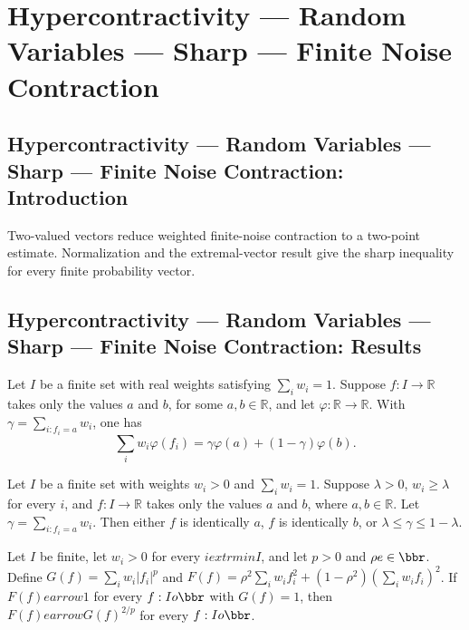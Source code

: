 \section{Hypercontractivity --- Random Variables --- Sharp --- Finite Noise Contraction}
\subsection*{Hypercontractivity --- Random Variables --- Sharp --- Finite Noise Contraction: Introduction}
Two-valued vectors reduce weighted finite-noise contraction to a two-point estimate. Normalization and the extremal-vector result give the sharp inequality for every finite probability vector.

\subsection*{Hypercontractivity --- Random Variables --- Sharp --- Finite Noise Contraction: Results}

\begin{theorem}
\leanok
{}
Let $I$ be a finite set with real weights satisfying $\sum_iw_i=1$. Suppose
$f:I\to\mathbb{R}$ takes only the values $a$ and $b$, for some $a,b\in\mathbb{R}$, and
let $\varphi:\mathbb{R}\to\mathbb{R}$. With $\gamma=\sum_{i:f_i=a}w_i$, one has
\[
\sum_iw_i\varphi(f_i)=\gamma\varphi(a)+(1-\gamma)\varphi(b).
\]
\end{theorem}

\begin{theorem}
\leanok
{}
Let $I$ be a finite set with weights $w_i>0$ and $\sum_iw_i=1$. Suppose $\lambda>0$,
$w_i\ge\lambda$ for every $i$, and $f:I\to\mathbb{R}$ takes only the values $a$ and $b$,
where $a,b\in\mathbb{R}$. Let $\gamma=\sum_{i:f_i=a}w_i$. Then either $f$ is identically
$a$, $f$ is identically $b$, or $\lambda\le\gamma\le1-\lambda$.
\end{theorem}

\begin{theorem}
\leanok
{}
Let $I$ be finite, let $w_i>0$ for every $i	extrm{ in }I$, and let $p>0$ and $\rho
e\in\bbr$. Define $G(f)=\sum_iw_i|f_i|^p$ and
$F(f)=\rho^2\sum_iw_if_i^2+(1-\rho^2)(\sum_iw_if_i)^2$. If $F(f)
earrow1$ for every $f:I	o\bbr$ with $G(f)=1$, then $F(f)
earrow G(f)^{2/p}$ for every $f:I	o\bbr$.
\end{theorem}

